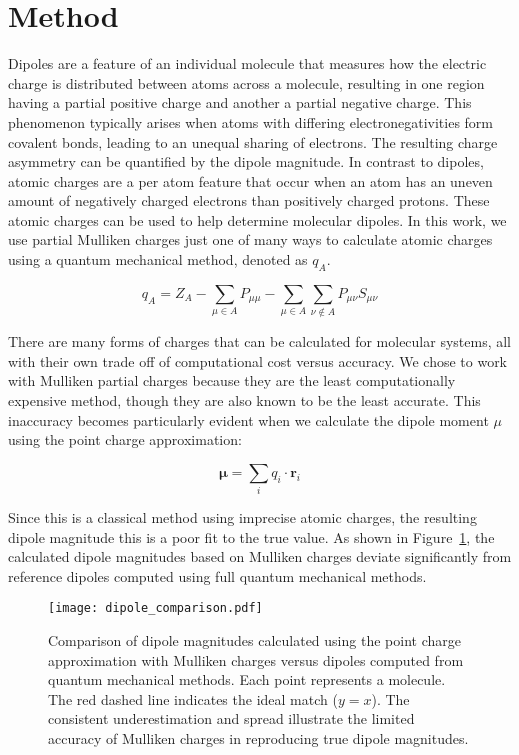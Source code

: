 \documentclass[journal=jctcce,manuscript=article]{achemso}
\begin{document}
\section{Method}

Dipoles are a feature of an individual molecule that measures how the electric charge is distributed between atoms across a molecule, resulting in one region having a partial positive charge and another a partial negative charge. This phenomenon typically arises when atoms with differing electronegativities form covalent bonds, leading to an unequal sharing of electrons. The resulting charge asymmetry can be quantified by the dipole magnitude. In contrast to dipoles, atomic charges are a per atom feature that occur when an atom has an uneven amount of negatively charged electrons than positively charged protons. These atomic charges can be used to help determine molecular dipoles. In this work, we use partial Mulliken charges just one of many ways to calculate atomic charges using a quantum mechanical method, denoted as \( q_A \).

\[
q_A = Z_A - \sum_{\mu \in A} P_{\mu\mu} - \sum_{\mu \in A} \sum_{\nu \notin A} P_{\mu\nu} S_{\mu\nu}
\]

There are many forms of charges that can be calculated for molecular systems, all with their own trade off of computational cost versus accuracy. We chose to work with Mulliken partial charges because they are the least computationally expensive method, though they are also known to be the least accurate. This inaccuracy becomes particularly evident when we calculate the dipole moment \( \mu \) using the point charge approximation:


\[
\boldsymbol{\mu} = \sum_i q_i \cdot \mathbf{r}_i
\]

Since this is a classical method using imprecise atomic charges, the resulting dipole magnitude this is a poor fit to the true value. As shown in Figure~\ref{fig:dipole_comparison}, the calculated dipole magnitudes based on Mulliken charges deviate significantly from reference dipoles computed using full quantum mechanical methods.

\begin{figure}[hptb]
    \centering
    \texttt{[image: dipole\_comparison.pdf]}
    \caption{Comparison of dipole magnitudes calculated using the point charge approximation with Mulliken charges versus dipoles computed from quantum mechanical methods. Each point represents a molecule. The red dashed line indicates the ideal match (\(y = x\)). The consistent underestimation and spread illustrate the limited accuracy of Mulliken charges in reproducing true dipole magnitudes.}
    \label{fig:dipole_comparison}
\end{figure}
\end{document}
